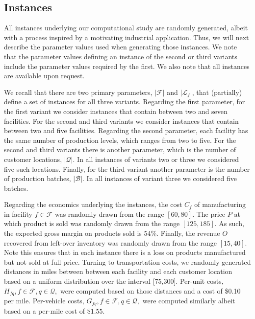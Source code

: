 \documentclass[12pt]{article}
\theoremstyle{thmstylethree}%
\begin{document}
\subsection{Instances}
\label{subsec:instances}

All instances underlying our computational study are randomly generated, albeit with a process inspired by a motivating industrial application. Thus, we will next describe the parameter values used when generating those instances. We note that the parameter values defining an instance of the second or third variants include the parameter values required by the first. We also note that all instances are available upon request. 

We recall that there are two primary parameters, $\vert \mathcal{F} \vert$ and $\vert \mathcal{L}_{f} \vert$, that (partially) define a set of instances for all three variants. Regarding the first parameter, for the first variant we consider instances that contain between two and seven facilities. For the second and third variants we consider instances that contain between two and five facilities. Regarding the second parameter, each facility has the same number of production levels, which ranges from two to five. For the second and third variants there is another parameter, which is the number of customer locations, $\vert \mathcal{Q} \vert.$ In all instances of variants two or three we considered five such locations. Finally, for the third variant another parameter is the number of production batches, $\vert \mathcal{B} \vert.$ In all instances of variant three we considered five batches. 

Regarding the economics underlying the instances, the cost $C_{f}$ of manufacturing in facility $f \in \mathcal{F}$ was randomly drawn from the range $[60,80].$ The price $P$ at which product is sold was randomly drawn from the range $[125,185]$. As such, the expected gross margin on products sold is 54\%.  Finally, the revenue $O$ recovered from left-over inventory was randomly drawn from the range $[15,40].$ Note this ensures that in each instance there is a loss on products manufactured but not sold at full price. Turning to transportation costs, we randomly generated distances in miles between between each facility and each customer location based on a uniform distribution over the interval [75,300].  Per-unit costs, $H_{fq}, f \in \mathcal{F}, q \in \mathcal{Q},$ were computed based on those distances and a cost of \$0.10 per mile. Per-vehicle costs, $G_{fq}, f \in \mathcal{F}, q \in \mathcal{Q},$ were computed similarly albeit based on a per-mile cost of \$1.55. 
\end{document}
